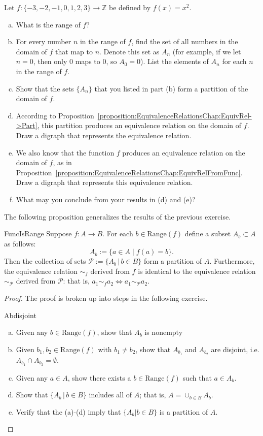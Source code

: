 \begin{exercise}{66}
Let $f\colon \{-3,-2,-1,0,1,2,3\} \to \mathbb{Z}$ be defined by $f(x) =  x^2$.
\begin{enumerate}[(a)]
\item
What is the range of $f$?
\item
For every number $n$ in the range of $f$, find the set of all numbers in the domain of $f$ that map to $n$. Denote this set as $A_n$ (for example, if we let $n=0$, then only 0 maps to 0, so $A_0 = 0$). List the elements of $A_n$ for each $n$ in the range of $f$. 
\item 
Show that the sets $\{ A_n \}$ that you listed in part (b) form a partition of the domain of $f$.
\item
According to Proposition~\ref{proposition:EquivalenceRelationsChap:EquivRel->Part}, this partition produces an equivalence relation  on  the domain of $f$.  Draw a digraph that represents the equivalence relation.
\item
We also know that the function $f$ produces an equivalence relation on the domain of $f$, as in Proposition~\ref{proposition:EquivalenceRelationsChap:EquivRelFromFunc}.  Draw a digraph that represents this equivalence relation.
\item
What may you conclude from your results in (d) and (e)?   
\end{enumerate}
\end{exercise}

The following proposition generalizes the results of the previous exercise.

\begin{prop}{FuncIsRange}
Suppose $f:A \rightarrow B$. For each $b \in \text{Range}(f)$ define a subset $A_b \subset A$ as follows:
$$A_b:=\{a \in A \mid f(a)=b \}.$$
Then the collection of sets $ \mathcal{P} :=\{A_b \, |\,  b \in B\}$ form a partition of $A$. Furthermore, the equivalence relation $\sim_f$ derived from $f$ is identical to the equivalence relation $\sim_{\mathcal{P}}$ derived from $\mathcal{P}$: that is, $a_1 \sim_f a_2 \iff a_1 \sim_{\mathcal{P}} a_2$.
\end{prop}
\begin{proof}  The proof is broken up into steps in the following exercise.

\begin{exercise}{Abdisjoint}
\begin{enumerate}[(a)]
\item Given any $b \in \text{Range}(f)$, show that $A_b$ is nonempty
\item Given $b_1, b_2\in \text{Range}(f)$ with $b_1 \neq b_2$, show that $A_{b_1}$ and $A_{b_2}$ are disjoint, i.e. $A_{b_1} \cap A_{b_2}=\emptyset$.  
\item Given any $a \in A$, show there exists a $b \in \text{Range}(f)$ such that $a \in A_b$. 
\item Show that $\{A_b \, | \, b \in B\}$ includes all of $A$; that is, $A=\cup_{b \in B} A_b$.
\item Verify that the (a)-(d) imply that $\{A_b | b \in B\}$ is a partition of $A$.
\end{enumerate}
\end{exercise}
\end{proof}

